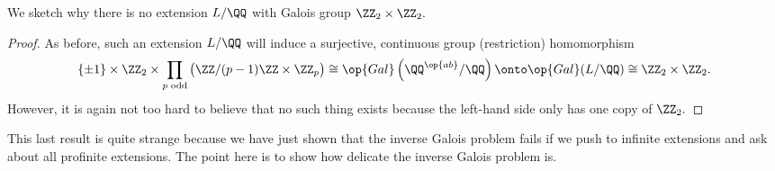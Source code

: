 \documentclass[../notes.tex]{subfiles}
\begin{document}
\begin{exe}
	We sketch why there is no extension $L/\QQ$ with Galois group $\ZZ_2\times\ZZ_2.$
\end{exe}
\begin{proof}
	As before, such an extension $L/\QQ$ will induce a surjective, continuous group (restriction) homomorphism
	\[\{\pm1\}\times\ZZ_2\times\prod_{p\text{ odd}}\big(\ZZ/(p-1)\ZZ\times\ZZ_p\big)\cong\op{Gal}\left(\QQ^{\op{ab}}/\QQ\right)\onto\op{Gal}(L/\QQ)\cong\ZZ_2\times\ZZ_2.\]
	However, it is again not too hard to believe that no such thing exists because the left-hand side only has one copy of $\ZZ_2.$
\end{proof}
This last result is quite strange because we have just shown that the inverse Galois problem fails if we push to infinite extensions and ask about all profinite extensions. The point here is to show how delicate the inverse Galois problem is.
\end{document}
